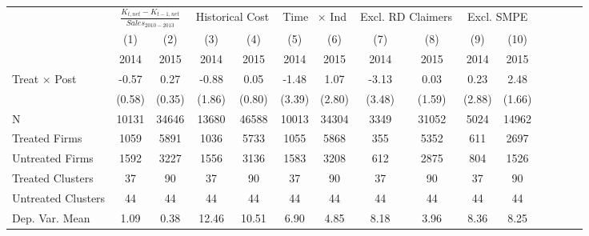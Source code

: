 \begin{tabular}{lcccccccccccccc}
\toprule
                    &\multicolumn{2}{c}{$\frac{K_{t,net} - K_{t-1,net}}{Sales_{2010-2013}}$}&\multicolumn{2}{c}{ Historical Cost}&\multicolumn{2}{c}{Time \ $\times$ Ind }&\multicolumn{2}{c}{Excl. RD Claimers}&\multicolumn{2}{c}{Excl. SMPE} \\\cmidrule(lr){2-3}\cmidrule(lr){4-5}\cmidrule(lr){6-7}\cmidrule(lr){8-9}\cmidrule(lr){10-11}
                    &         (1)   &         (2)   &         (3)   &         (4)   &         (5)   &         (6)   &         (7)   &         (8)   &         (9)   &        (10)   \\
                    &        2014   &        2015   &        2014   &        2015   &        2014   &        2015   &        2014   &        2015   &        2014   &        2015   \\
\midrule
Treat $\times$ Post &       -0.57   &        0.27   &       -0.88   &        0.05   &       -1.48   &        1.07   &       -3.13   &        0.03   &        0.23   &        2.48   \\
                    &      (0.58)   &      (0.35)   &      (1.86)   &      (0.80)   &      (3.39)   &      (2.80)   &      (3.48)   &      (1.59)   &      (2.88)   &      (1.66)   \\
\addlinespace
\midrule
N                   &       10131   &       34646   &       13680   &       46588   &       10013   &       34304   &        3349   &       31052   &        5024   &       14962   \\
Treated Firms       &        1059   &        5891   &        1036   &        5733   &        1055   &        5868   &         355   &        5352   &         611   &        2697   \\
Untreated Firms     &        1592   &        3227   &        1556   &        3136   &        1583   &        3208   &         612   &        2875   &         804   &        1526   \\
Treated Clusters    &          37   &          90   &          37   &          90   &          37   &          90   &          37   &          90   &          37   &          90   \\
Untreated Clusters  &          44   &          44   &          44   &          44   &          44   &          44   &          44   &          44   &          44   &          44   \\
Dep. Var. Mean      &        1.09   &        0.38   &       12.46   &       10.51   &        6.90   &        4.85   &        8.18   &        3.96   &        8.36   &        8.25   \\
\bottomrule
\end{tabular}

